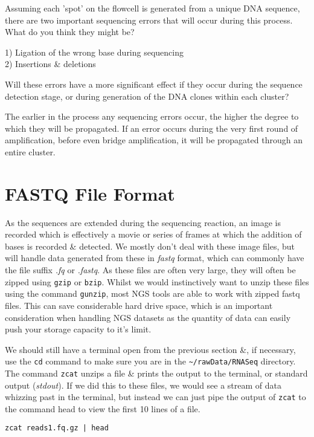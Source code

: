 \begin{questions}
Assuming each 'spot' on the flowcell is generated from a unique DNA sequence, there are two important sequencing errors that will occur during this process.
What do you think they might be? \\
\begin{answer}
1) Ligation of the wrong base during sequencing \\
2) Insertions \& deletions \\
\end{answer}

Will these errors have a more significant effect if they occur during the sequence detection stage, or during generation of the DNA clones within each cluster? \\
\begin{answer}
The earlier in the process any sequencing errors occur, the higher the degree to which they will be propagated.
If an error occurs during the very first round of amplification, before even bridge amplification, it will be propagated through an entire cluster. \\
\end{answer}
\end{questions}

\section{FASTQ File Format}
\begin{note}
As the sequences are extended during the sequencing reaction, an image is recorded which is effectively a movie or series of frames at which the addition of bases is recorded \& detected.
We mostly don't deal with these image files, but will handle data generated from these in \textit{fastq} format, which can commonly have the file suffix \textit{.fq} or \textit{.fastq}.
As these files are often very large, they will often be zipped using \texttt{gzip} or \texttt{bzip}.
Whilst we would instinctively want to unzip these files using the command \texttt{gunzip}, most NGS tools are able to work with zipped fastq files.
This can save considerable hard drive space, which is an important consideration when handling NGS datasets as the quantity of data can easily push your storage capacity to it's limit. \\
\end{note}

\begin{steps}
We should still have a terminal open from the previous section \&, if necessary, use the \texttt{cd} command to make sure you are in the \texttt{\~{}/rawData/RNASeq} directory.
The command \texttt{zcat} unzips a file \& prints the output to the terminal, or standard output (\textit{stdout}).
If we did this to these files, we would see a stream of data whizzing past in the terminal, but instead we can just pipe the output of \texttt{zcat} to the command head to view the first 10 lines of a file. \\
\begin{lstlisting}
zcat reads1.fq.gz | head
\end{lstlisting}
\end{steps}


